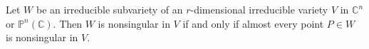 Let $W$ be an irreducible subvariety of an $r$-dimensional irreducible variety $V$ in $\mathbb{C}^n$ or $\mathbb{P}^n(\mathbb{C})$. Then $W$ is nonsingular in $V$ if and only if almost every point $P \in W$ is nonsingular in $V$.
